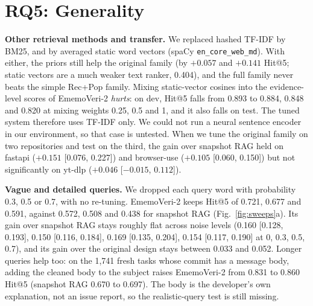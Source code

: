 \documentclass[conference]{IEEEtran}
\newcommand{\sys}{EmemoVeri}
\begin{document}
\begin{table}[t]\centering\footnotesize\setlength{\tabcolsep}{4pt}
\resizebox{0.97\textwidth}{!}{}
\caption{Component analysis of the frozen \sys{}-2 on new data: Hit@5 lost when one ingredient is removed (full minus variant; positive means the ingredient helps). Unit: repository; Holm correction over the eight rows. Rename carry-over needs a separate replay and was run on the fresh set only.}
\label{tab:component}
\end{table}

\section{RQ5: Generality}
\label{sec:general}
\textbf{Other retrieval methods and transfer.} We replaced hashed TF-IDF by BM25, and by averaged static word vectors (spaCy \texttt{en\_core\_web\_md}). With either, the priors still help the original family (by $+0.057$ and $+0.141$ Hit@5; static vectors are a much weaker text ranker, 0.404), and the full family never beats the simple Rec+Pop family. Mixing static-vector cosines into the evidence-level scores of \sys{}-2 \emph{hurts}: on dev, Hit@5 falls from 0.893 to 0.884, 0.848 and 0.820 at mixing weights 0.25, 0.5 and 1, and it also falls on test. The tuned system therefore uses TF-IDF only. We could not run a neural sentence encoder in our environment, so that case is untested. When we tune the original family on two repositories and test on the third, the gain over snapshot RAG held on fastapi ($+0.151$ [0.076, 0.227]) and browser-use ($+0.105$ [0.060, 0.150]) but not significantly on yt-dlp ($+0.046$ [$-0.015$, $0.112$]).

\textbf{Vague and detailed queries.} We dropped each query word with probability 0.3, 0.5 or 0.7, with no re-tuning. \sys{}-2 keeps Hit@5 of 0.721, 0.677 and 0.591, against 0.572, 0.508 and 0.438 for snapshot RAG (Fig.~\ref{fig:sweeps}a). Its gain over snapshot RAG stays roughly flat across noise levels (0.160 [0.128, 0.193], 0.150 [0.116, 0.184], 0.169 [0.135, 0.204], 0.154 [0.117, 0.190] at 0, 0.3, 0.5, 0.7), and its gain over the original design stays between 0.033 and 0.052. Longer queries help too: on the 1{,}741 fresh tasks whose commit has a message body, adding the cleaned body to the subject raises \sys{}-2 from 0.831 to 0.860 Hit@5 (snapshot RAG 0.670 to 0.697). The body is the developer's own explanation, not an issue report, so the realistic-query test is still missing.
\end{document}
